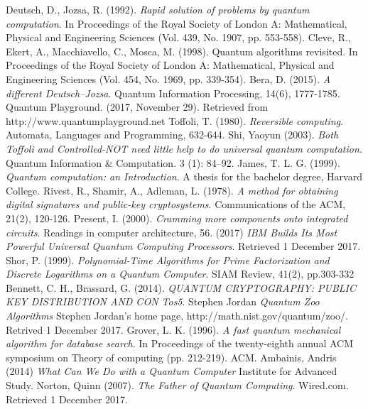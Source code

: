 \documentclass[12pt,a4paper,openright]{report}
\begin{document}
\begin{thebibliography}{40}
     Deutsch, D., Jozsa, R. (1992). \emph{Rapid solution of problems by quantum computation}. In Proceedings of the Royal Society of London A: Mathematical, Physical and Engineering Sciences (Vol. 439, No. 1907, pp. 553-558).
     Cleve, R., Ekert, A., Macchiavello, C., Mosca, M. (1998). Quantum algorithms revisited. In Proceedings of the Royal Society of London A: Mathematical, Physical and Engineering Sciences (Vol. 454, No. 1969, pp. 339-354). 
     Bera, D. (2015). \emph{A different Deutsch–Jozsa}. Quantum Information Processing, 14(6), 1777-1785.
     Quantum Playground. (2017, November 29). Retrieved  from http://www.quantumplayground.net 
     Toffoli, T. (1980). \emph{Reversible computing}. Automata, Languages and Programming, 632-644.
     Shi, Yaoyun (2003). \emph{Both Toffoli and Controlled-NOT need little help to do universal quantum computation.} Quantum Information & Computation. 3 (1): 84–92.
     James, T. L. G. (1999). \emph{Quantum computation: an Introduction}. A thesis for the bachelor degree, Harvard College. 
     Rivest, R., Shamir, A., Adleman, L. (1978). \emph{A method for obtaining digital signatures and public-key cryptosystems}. Communications of the ACM, 21(2), 120-126.
     Present, I. (2000). \emph{Cramming more components onto integrated circuits}. Readings in computer architecture, 56.
     (2017) \emph{IBM Builds Its Most Powerful Universal Quantum Computing Processors}. Retrieved 1 December 2017.
     Shor, P. (1999). \emph{Polynomial-Time Algorithms for Prime Factorization and Discrete Logarithms on a Quantum Computer}. SIAM Review, 41(2), pp.303-332
     Bennett, C. H., Brassard, G. (2014). \emph{QUANTUM CRYPTOGRAPHY: PUBLIC KEY DISTRIBUTION AND CON Tos5}.
     Stephen Jordan \emph{Quantum Zoo Algorithms} Stephen Jordan's home page, http://math.nist.gov/quantum/zoo/. Retrived 1 December 2017.
     Grover, L. K. (1996). \emph{A fast quantum mechanical algorithm for database search}. In Proceedings of the twenty-eighth annual ACM symposium on Theory of computing (pp. 212-219). ACM.
     Ambainis, Andris (2014) \emph{What Can We Do with a Quantum Computer} Institute for Advanced Study.
     Norton, Quinn (2007). \emph{The Father of Quantum Computing}. Wired.com. Retrieved 1 December 2017.
\end{thebibliography}
\end{document}
